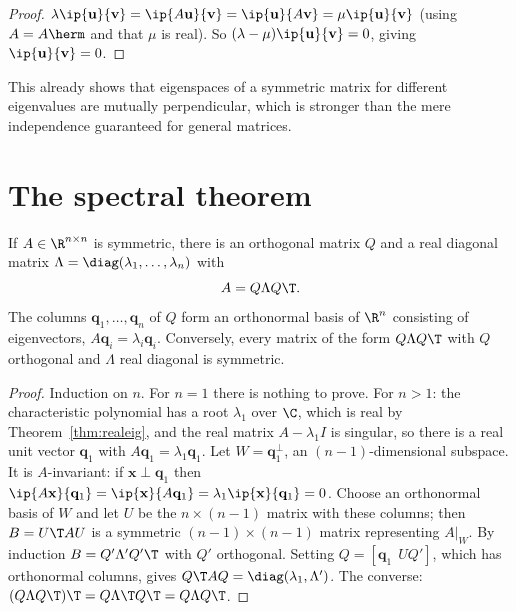 \begin{proof}
$\lambda\ip{\mathbf{u}}{\mathbf{v}}=\ip{A\mathbf{u}}{\mathbf{v}}=\ip{\mathbf{u}}{A\mathbf{v}}=\mu\ip{\mathbf{u}}{\mathbf{v}}$ (using $A=A\herm$ and that $\mu$ is real). So $(\lambda-\mu)\ip{\mathbf{u}}{\mathbf{v}}=0$, giving $\ip{\mathbf{u}}{\mathbf{v}}=0$.
\end{proof}

This already shows that eigenspaces of a symmetric matrix for different eigenvalues are mutually perpendicular, which is stronger than the mere independence guaranteed for general matrices.

\section{The spectral theorem}

\begin{theorem}\label{thm:spectral}
If $A\in\R^{n\times n}$ is symmetric, there is an orthogonal matrix $Q$ and a real diagonal matrix $\Lambda=\diag(\lambda_1,\dots,\lambda_n)$ with
\[ A=Q\Lambda Q\T. \]
The columns $\mathbf{q}_1,\dots,\mathbf{q}_n$ of $Q$ form an orthonormal basis of $\R^n$ consisting of eigenvectors, $A\mathbf{q}_i=\lambda_i\mathbf{q}_i$. Conversely, every matrix of the form $Q\Lambda Q\T$ with $Q$ orthogonal and $\Lambda$ real diagonal is symmetric.
\end{theorem}

\begin{proof}
Induction on $n$. For $n=1$ there is nothing to prove. For $n>1$: the characteristic polynomial has a root $\lambda_1$ over $\C$, which is real by Theorem~\ref{thm:realeig}, and the real matrix $A-\lambda_1I$ is singular, so there is a real unit vector $\mathbf{q}_1$ with $A\mathbf{q}_1=\lambda_1\mathbf{q}_1$. Let $W=\mathbf{q}_1^\perp$, an $(n-1)$-dimensional subspace. It is $A$-invariant: if $\mathbf{x}\perp\mathbf{q}_1$ then $\ip{A\mathbf{x}}{\mathbf{q}_1}=\ip{\mathbf{x}}{A\mathbf{q}_1}=\lambda_1\ip{\mathbf{x}}{\mathbf{q}_1}=0$. Choose an orthonormal basis of $W$ and let $U$ be the $n\times(n-1)$ matrix with these columns; then $B=U\T AU$ is a symmetric $(n-1)\times(n-1)$ matrix representing $A|_W$. By induction $B=Q'\Lambda'Q'{}\T$ with $Q'$ orthogonal. Setting $Q=[\mathbf{q}_1\ \ UQ']$, which has orthonormal columns, gives $Q\T AQ=\diag(\lambda_1,\Lambda')$. The converse: $(Q\Lambda Q\T)\T=Q\Lambda\T Q\T=Q\Lambda Q\T$.
\end{proof}

